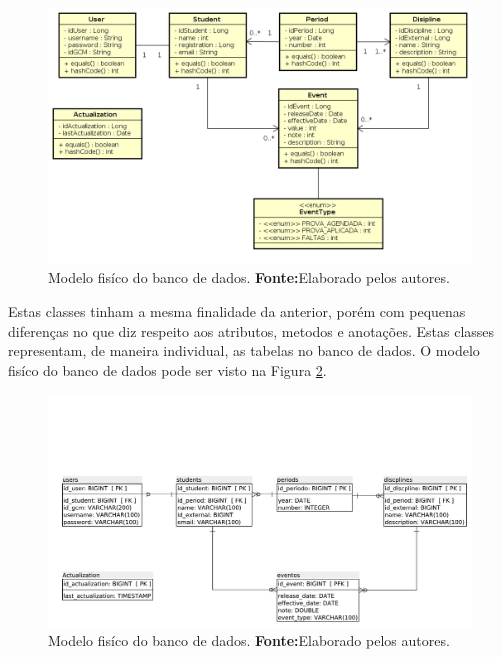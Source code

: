 	
	\begin{figure}[h!]
		\centerline{\includegraphics[scale=0.55]{./imagens/2_q_metodologico/4_procedimentos_resultados/43_webservice/432_desenvolvimento/diagrama.png}}
		\caption[Modelo fisíco do banco de dados]{Modelo fisíco do banco de dados.
			\textbf{Fonte:}Elaborado pelos autores.}
		\label{fig:desws12}
	\end{figure}
	
	\pagebreak
	
	\par Estas classes tinham a mesma finalidade da anterior, porém com pequenas
diferenças no que diz respeito aos atributos, metodos e anotações. Estas classes
representam, de maneira individual, as tabelas no banco de dados. O modelo
fisíco do banco de dados pode ser visto na Figura \ref{fig:desws12_1}.
	
	
	\begin{figure}[h!]
		\centerline{\includegraphics[scale=0.55]{./imagens/2_q_metodologico/4_procedimentos_resultados/43_webservice/432_desenvolvimento/mer_ws.pdf}}
		\caption[Modelo fisíco do banco de dados]{Modelo fisíco do banco de dados.
			\textbf{Fonte:}Elaborado pelos autores.}
		\label{fig:desws12_1}
	\end{figure}
	

